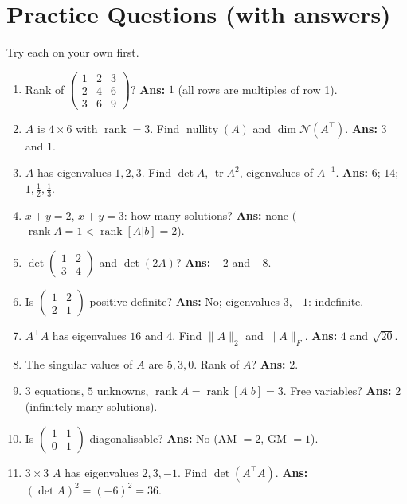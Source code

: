 \documentclass[11pt,a4paper]{article}
\newcommand{\T}{^{\top}}
\newcommand{\rank}{\operatorname{rank}}
\newcommand{\nullity}{\operatorname{nullity}}
\newcommand{\tr}{\operatorname{tr}}
\newcommand{\Null}{\mathcal{N}}
\begin{document}
\section{Practice Questions (with answers)}
Try each on your own first.
\begin{enumerate}[leftmargin=*,itemsep=4pt]
\item Rank of $\begin{pmatrix}1&2&3\\2&4&6\\3&6&9\end{pmatrix}$? \hfill \textbf{Ans: } $1$ (all rows are multiples of row 1).
\item $A$ is $4\times6$ with $\rank=3$. Find $\nullity(A)$ and $\dim\Null(A\T)$. \hfill \textbf{Ans: } $3$ and $1$.
\item $A$ has eigenvalues $1,2,3$. Find $\det A$, $\tr A^2$, eigenvalues of $A^{-1}$. \hfill \textbf{Ans: } $6$; $14$; $1,\frac12,\frac13$.
\item $x+y=2$, $x+y=3$: how many solutions? \hfill \textbf{Ans: } none ($\rank A=1<\rank[A|b]=2$).
\item $\det\begin{pmatrix}1&2\\3&4\end{pmatrix}$ and $\det(2A)$? \hfill \textbf{Ans: } $-2$ and $-8$.
\item Is $\begin{pmatrix}1&2\\2&1\end{pmatrix}$ positive definite? \hfill \textbf{Ans: } No; eigenvalues $3,-1$: indefinite.
\item $A\T A$ has eigenvalues $16$ and $4$. Find $\|A\|_2$ and $\|A\|_F$. \hfill \textbf{Ans: } $4$ and $\sqrt{20}$.
\item The singular values of $A$ are $5,3,0$. Rank of $A$? \hfill \textbf{Ans: } $2$.
\item $3$ equations, $5$ unknowns, $\rank A=\rank[A|b]=3$. Free variables? \hfill \textbf{Ans: } $2$ (infinitely many solutions).
\item Is $\begin{pmatrix}1&1\\0&1\end{pmatrix}$ diagonalisable? \hfill \textbf{Ans: } No (AM $=2$, GM $=1$).
\item $3\times3$ $A$ has eigenvalues $2,3,-1$. Find $\det(A\T A)$. \hfill \textbf{Ans: } $(\det A)^2=(-6)^2=36$.

\end{enumerate}
\end{document}
